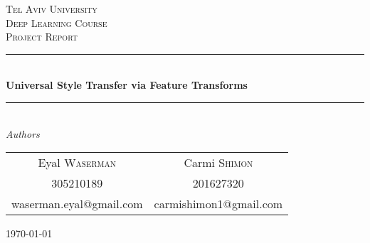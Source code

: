 \documentclass[letter,11pt]{article}
\theoremstyle{plain}
\theoremstyle{definition}
\theoremstyle{plain}
\theoremstyle{definition}
\begin{document}
	
	\begin{titlepage} %
		\newcommand{\HRule}{\rule{\linewidth}{0.5mm}} %
		
		\center %
		
		\textsc{\LARGE Tel Aviv University}\\[1.5cm] %
		\textsc{\Large Deep Learning Course}\\[0.5cm] %
		\textsc{\large Project Report}\\[0.5cm] %
		
		\HRule\\[0.4cm]
		{\LARGE\bfseries Universal Style Transfer via Feature Transforms}\\[0.4cm] %
		\HRule\\[1.5cm]
		
		{\large\textit{Authors}}\\
		\begin{center}
			\begin{tabular}{c c}
				Eyal \textsc{Waserman} & Carmi \textsc{Shimon}\\%
				305210189 & 201627320 \\
				waserman.eyal@gmail.com & carmishimon1@gmail.com
			\end{tabular}
		\end{center}
		
		
		\vfill\vfill\vfill %
		{\large\today} %
		
		
		\vfill %
		
	\end{titlepage}
	
\end{document}
